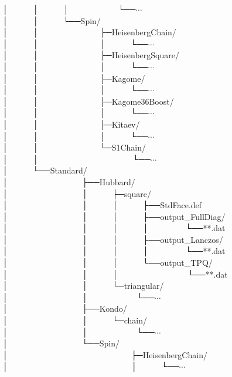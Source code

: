 │~~~~~~│~~~~~~│~~~~~~~~~~~~└──$\cdots$\\
│~~~~~~│~~~~~~└──Spin/\\
│~~~~~~│~~~~~~~~~~~~~~~├─HeisenbergChain/\\
│~~~~~~│~~~~~~~~~~~~~~~│~~~~~~└──$\cdots$\\
│~~~~~~│~~~~~~~~~~~~~~~├─HeisenbergSquare/\\
│~~~~~~│~~~~~~~~~~~~~~~│~~~~~~└──$\cdots$\\
│~~~~~~│~~~~~~~~~~~~~~~├─Kagome/\\
│~~~~~~│~~~~~~~~~~~~~~~│~~~~~~└──$\cdots$\\
│~~~~~~│~~~~~~~~~~~~~~~├─Kagome36Boost/\\
│~~~~~~│~~~~~~~~~~~~~~~│~~~~~~└──$\cdots$\\
│~~~~~~│~~~~~~~~~~~~~~~├─Kitaev/\\
│~~~~~~│~~~~~~~~~~~~~~~│~~~~~~└──$\cdots$\\
│~~~~~~│~~~~~~~~~~~~~~~└─S1Chain/\\
│~~~~~~│~~~~~~~~~~~~~~~~~~~~~~~└──$\cdots$\\
│~~~~~~└──Standard/\\
│~~~~~~~~~~~~~~~~~~├──Hubbard/\\
│~~~~~~~~~~~~~~~~~~│~~~~~~├─square/\\
│~~~~~~~~~~~~~~~~~~│~~~~~~│~~~~~~├──StdFace.def\\
│~~~~~~~~~~~~~~~~~~│~~~~~~│~~~~~~├──output\_FullDiag/\\
│~~~~~~~~~~~~~~~~~~│~~~~~~│~~~~~~│~~~~~~~~~└──**.dat\\
│~~~~~~~~~~~~~~~~~~│~~~~~~│~~~~~~├──output\_Lanczos/\\
│~~~~~~~~~~~~~~~~~~│~~~~~~│~~~~~~│~~~~~~~~~└──**.dat\\
│~~~~~~~~~~~~~~~~~~│~~~~~~│~~~~~~└──output\_TPQ/\\
│~~~~~~~~~~~~~~~~~~│~~~~~~│~~~~~~~~~~~~~~~~~└──**.dat\\
│~~~~~~~~~~~~~~~~~~│~~~~~~└─triangular/\\
│~~~~~~~~~~~~~~~~~~│~~~~~~~~~~~~└──$\cdots$\\
│~~~~~~~~~~~~~~~~~~├──Kondo/\\
│~~~~~~~~~~~~~~~~~~│~~~~~~└─chain/\\
│~~~~~~~~~~~~~~~~~~│~~~~~~~~~~~~└──$\cdots$\\
│~~~~~~~~~~~~~~~~~~└──Spin/\\
│~~~~~~~~~~~~~~~~~~~~~~~~~~~~~~├─HeisenbergChain/\\
│~~~~~~~~~~~~~~~~~~~~~~~~~~~~~~│~~~~~~└──$\cdots$\\
